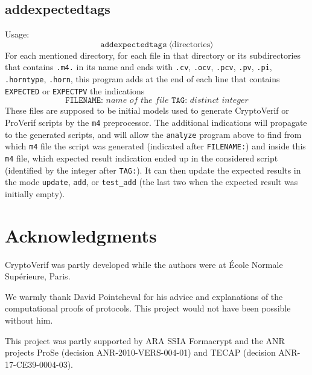 \documentclass{article}
\newcommand{\nonterm}[1]{\langle\textrm{#1}\rangle}
\begin{document}
\subsection{\ttfamily addexpectedtags}

Usage:
\[\texttt{addexpectedtags}\ \nonterm{directories}\]
For each mentioned directory, for each file in that directory or its subdirectories that contains \texttt{.m4.} in its name and ends with \texttt{.cv},
\texttt{.ocv}, \texttt{.pcv}, \texttt{.pv}, \texttt{.pi}, \texttt{.horntype}, \texttt{.horn}, this program adds at the end of each line that contains \texttt{EXPECTED} or \texttt{EXPECTPV} the indications
\[\texttt{FILENAME: }\textit{name of the file}\texttt{ TAG: }\textit{distinct integer}\]
These files are supposed to be initial models used to generate CryptoVerif or ProVerif scripts by the \texttt{m4} preprocessor. The additional indications will
propagate to the generated scripts, and will allow the \texttt{analyze} program above to find from which \texttt{m4} file the script was generated (indicated after \texttt{FILENAME:}) and inside this \texttt{m4} file, which expected result indication ended up in the considered script (identified by the integer after \texttt{TAG:}). It can then update the expected results in the mode \texttt{update}, \texttt{add}, or \texttt{test\_add} (the last two when the expected result was initially empty).

\section*{Acknowledgments}

CryptoVerif was partly developed while the authors were at \'Ecole Normale Sup\'erieure, Paris.

We warmly thank David Pointcheval for his advice and explanations
of the computational proofs of protocols. This project would not have
been possible without him.

This project was partly supported by ARA SSIA Formacrypt and
the ANR projects ProSe (decision ANR-2010-VERS-004-01)
and TECAP (decision ANR-17-CE39-0004-03).


\end{document}
